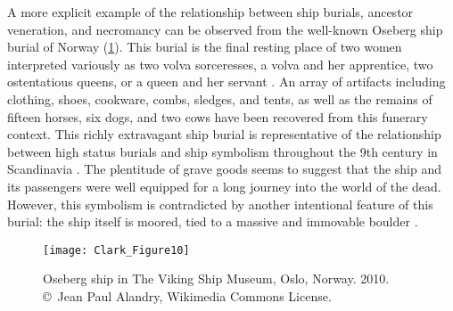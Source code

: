 A more explicit example of the relationship between ship burials, ancestor veneration, and necromancy can be observed from the well-known Oseberg ship burial of Norway (\cref{fig:Clark_Figure10}).
This burial is the final resting place of two women interpreted variously as two volva sorceresses, a volva and her apprentice, two ostentatious queens, or a queen and her servant \parencite{Ruffoni_2011}.
An array of artifacts including clothing, shoes, cookware, combs, sledges, and tents, as well as the remains of fifteen horses, six dogs, and two cows have been recovered from this funerary context. This richly extravagant ship burial is representative of the relationship between high status burials and ship symbolism throughout the 9th century in Scandinavia \parencite[20--25]{Ruffoni_2011}.
The plentitude of grave goods seems to suggest that the ship and its passengers were well equipped for a long journey into the world of the dead. However, this symbolism is contradicted by another intentional feature of this burial: the ship itself is moored, tied to a massive and immovable boulder \parencite[262]{Price_2008}.

\begin{figure}[!tb]
	\texttt{[image: Clark\_Figure10]}
	\caption{Oseberg ship in The Viking Ship Museum, Oslo, Norway. 2010.
		{\normalfont\scriptsize \\ \copyright\ Jean Paul Alandry, Wikimedia Commons License.
	}}
	\label{fig:Clark_Figure10}
\end{figure}


